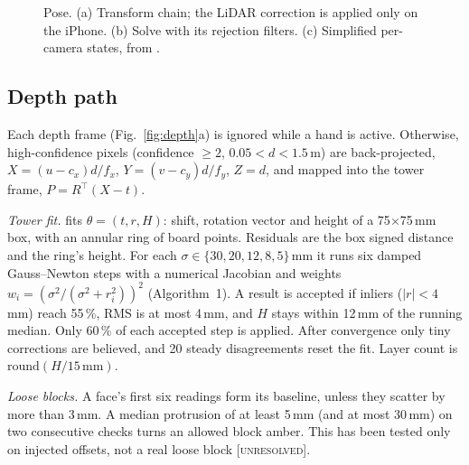 \documentclass[conference,10pt]{IEEEtran}
\newcommand{\code}[1]{\texttt{\small\detokenize{#1}}}
\newcommand{\evU}{\textsc{[unresolved]}}
\begin{document}
\begin{figure}[!t]
\caption{Pose. (a) Transform chain; the LiDAR correction is applied only on the iPhone. (b) Solve with its rejection filters. (c) Simplified per-camera states, from \protect\code{_draw_overlay}.}\label{fig:pose}
\end{figure}

\subsection{Depth path}\label{sec:depth}
Each depth frame (Fig.~\ref{fig:depth}a) is ignored while a hand is active. Otherwise, high-confidence pixels (confidence $\geq2$, $0.05<d<1.5$\,m) are back-projected, $X=(u-c_x)d/f_x$, $Y=(v-c_y)d/f_y$, $Z=d$, and mapped into the tower frame, $P=R^\top(X-t)$.

\emph{Tower fit.} \code{tower_fit.fit_box} fits $\theta=(t,r,H)$: shift, rotation vector and height of a 75$\times$75\,mm box, with an annular ring of board points. Residuals are the box signed distance and the ring's height. For each $\sigma\in\{30,20,12,8,5\}$\,mm it runs six damped Gauss--Newton steps with a numerical Jacobian and weights $w_i=(\sigma^2/(\sigma^2+r_i^2))^2$ (Algorithm~1). A result is accepted if inliers ($|r|<4$\,mm) reach 55\,\%, RMS is at most 4\,mm, and $H$ stays within 12\,mm of the running median. Only 60\,\% of each accepted step is applied. After convergence only tiny corrections are believed, and 20 steady disagreements reset the fit. Layer count is $\mathrm{round}(H/15\,\mathrm{mm})$.

\emph{Loose blocks.} A face's first six readings form its baseline, unless they scatter by more than 3\,mm. A median protrusion of at least 5\,mm (and at most 30\,mm) on two consecutive checks turns an allowed block amber. This has been tested only on injected offsets, not a real loose block \evU.
\end{document}
